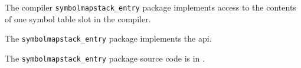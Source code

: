 
The compiler {\tt symbolmapstack\_entry} package implements access to the contents of one symbol 
table slot in the compiler.

The {\tt symbolmapstack\_entry} package implements the  api.

The {\tt symbolmapstack\_entry} package source code is in .


